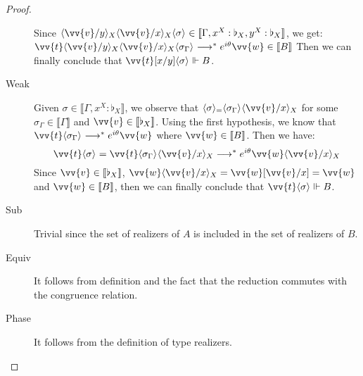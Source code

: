 \documentclass[runningheads,orivec,envcountsame,envcountsect]{llncs}
\newcommand\lra{\longrightarrow}
\newcommand\ansubst[2]{\ensuremath{\langle #1 \rangle_{#2}}}
\def\eval{\lra^*}
\def\sem#1{\llbracket#1\rrbracket}
\def\real{\Vdash}
\newcommand\basis[1]{\ensuremath{\flat_{#1}}}
\begin{document}
\begin{proof}
\begin{description}
    Since $\ansubst{\vv{v}/y}{X}\ansubst{\vv{v}/x}{X}\ansubst{\sigma}{}\in\sem{\Gamma, x^X:\basis{X}, y^X:\basis{X}}$, we get: $\vv{t}\ansubst{\vv{v}/y}{X}\ansubst{\vv{v}/x}{X}\\\ansubst{\sigma_\Gamma}{}\eval e^{i\theta}\vv{w}\in\sem{B}$
    Then we can finally conclude that $\vv{t}[x/y]\ansubst{\sigma}{}\real B$.

    \item[Weak] Given $\sigma\in\sem{\Gamma,x^X:\basis{X}}$, we observe that $\ansubst{\sigma}=\ansubst{\sigma_\Gamma}{}\ansubst{\vv{v}/x}{X}$ for some $\sigma_\Gamma\in\sem{\Gamma}$ and $\vv{v}\in\sem{\basis{X}}$. Using the first hypothesis, we know that $\vv{t}\ansubst{\sigma_\Gamma}{}\eval e^{i\theta}\vv{w}$ where $\vv{w}\in\sem{B}$. Then we have:
    \[
    \vv{t}\ansubst{\sigma}{}=\vv{t}\ansubst{\sigma_\Gamma}{}\ansubst{\vv{v}/x}{X}\eval e^{i\theta}\vv{w}\ansubst{\vv{v}/x}{X}
    \]
    Since $\vv{v}\in\sem{\basis{X}}$, $\vv{w}\ansubst{\vv{v}/x}{X}=\vv{w}[\vv{v}/x]=\vv{w}$ and $\vv{w}\in\sem{B}$, then we can finally conclude that $\vv{t}\ansubst{\sigma}{}\real B$.
    
    \item[Sub] Trivial since the set of realizers of ${A}$ is included in the set of realizers of ${B}$. 

    \item[Equiv] It follows from definition and the fact that the reduction commutes with the congruence relation.
    
    \item[Phase] It follows from the definition of type realizers.
    \end{description}
\end{proof}
\end{document}

